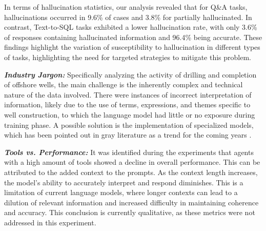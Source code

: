                 In terms of hallucination statistics, our analysis revealed that for Q\&A tasks, hallucinations occurred in 9.6\% of cases and 3.8\% for partially hallucinated. 
                In contrast, Text-to-SQL tasks exhibited a lower hallucination rate, with only 3.6\% of responses containing hallucinated information and 96.4\% being accurate. 
                These findings highlight the variation of susceptibility to hallucination in different types of tasks, highlighting the need for targeted strategies to mitigate this problem.
            
            \setlength{\parindent}{1em}
            \textbf{\textit{Industry Jargon:}}
                Specifically analyzing the activity of drilling and completion of offshore wells, the main challenge is the inherently complex and technical nature of the data involved. 
                There were instances of incorrect interpretation of information, likely due to the use of terms, expressions, and themes specific to well construction, to which the language model had little or no exposure during training phase. 
                A possible solution is the implementation of specialized models, which has been pointed out in gray literature as a trend for the coming years \citep{Shah2024, Meena2023, Ghosh2023}.
            
            \setlength{\parindent}{1em}
            \textbf{\textit{Tools vs. Performance:}} 
                It was identified during the experiments that agents with a high amount of tools showed a decline in overall performance. 
                This can be attributed to the added context to the prompts. 
                As the context length increases, the model's ability to accurately interpret and respond diminishes.
                This is a limitation of current language models, where longer contexts can lead to a dilution of relevant information and increased difficulty in maintaining coherence and accuracy. 
                This conclusion is currently qualitative, as these metrics were not addressed in this experiment.

